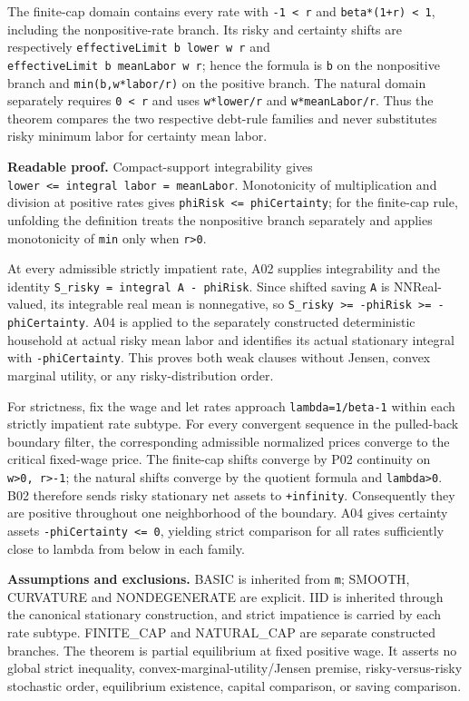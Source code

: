 \documentclass[
  11pt,
]{article}
\let\LedgerOriginalTexttt\texttt
\renewcommand{\texttt}[1]{{\small\LedgerOriginalTexttt{#1}}}
\begin{document}
The finite-cap domain contains every rate with
\texttt{-1\ \textless{}\ r} and \texttt{beta*(1+r)\ \textless{}\ 1},
including the nonpositive-rate branch. Its risky and certainty shifts
are respectively \texttt{effectiveLimit\ b\ lower\ w\ r} and
\texttt{effectiveLimit\ b\ meanLabor\ w\ r}; hence the formula is
\texttt{b} on the nonpositive branch and \texttt{min(b,w*labor/r)} on
the positive branch. The natural domain separately requires
\texttt{0\ \textless{}\ r} and uses \texttt{w*lower/r} and
\texttt{w*meanLabor/r}. Thus the theorem compares the two respective
debt-rule families and never substitutes risky minimum labor for
certainty mean labor.

\textbf{Readable proof.} Compact-support integrability gives
\texttt{lower\ \textless{}=\ integral\ labor\ =\ meanLabor}.
Monotonicity of multiplication and division at positive rates gives
\texttt{phiRisk\ \textless{}=\ phiCertainty}; for the finite-cap rule,
unfolding the definition treats the nonpositive branch separately and
applies monotonicity of \texttt{min} only when
\texttt{r\textgreater{}0}.

At every admissible strictly impatient rate, A02 supplies integrability
and the identity \texttt{S\_risky\ =\ integral\ A\ -\ phiRisk}. Since
shifted saving \texttt{A} is NNReal-valued, its integrable real mean is
nonnegative, so
\texttt{S\_risky\ \textgreater{}=\ -phiRisk\ \textgreater{}=\ -phiCertainty}.
A04 is applied to the separately constructed deterministic household at
actual risky mean labor and identifies its actual stationary integral
with \texttt{-phiCertainty}. This proves both weak clauses without
Jensen, convex marginal utility, or any risky-distribution order.

For strictness, fix the wage and let rates approach
\texttt{lambda=1/beta-1} within each strictly impatient rate subtype.
For every convergent sequence in the pulled-back boundary filter, the
corresponding admissible normalized prices converge to the critical
fixed-wage price. The finite-cap shifts converge by P02 continuity on
\texttt{w\textgreater{}0,\ r\textgreater{}-1}; the natural shifts
converge by the quotient formula and \texttt{lambda\textgreater{}0}. B02
therefore sends risky stationary net assets to \texttt{+infinity}.
Consequently they are positive throughout one neighborhood of the
boundary. A04 gives certainty assets
\texttt{-phiCertainty\ \textless{}=\ 0}, yielding strict comparison for
all rates sufficiently close to lambda from below in each family.

\textbf{Assumptions and exclusions.} BASIC is inherited from \texttt{m};
SMOOTH, CURVATURE and NONDEGENERATE are explicit. IID is inherited
through the canonical stationary construction, and strict impatience is
carried by each rate subtype. FINITE\_CAP and NATURAL\_CAP are separate
constructed branches. The theorem is partial equilibrium at fixed
positive wage. It asserts no global strict inequality,
convex-marginal-utility/Jensen premise, risky-versus-risky stochastic
order, equilibrium existence, capital comparison, or saving comparison.
\end{document}
